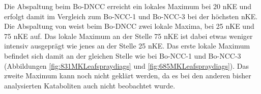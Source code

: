  Die  Abspaltung beim Bo-DNCC erreicht ein lokales Maximum bei 20 \gls{nKE} und erfolgt damit im Vergleich zum Bo-NCC-1 und Bo-NCC-3 bei der höchsten \gls{nKE}. Die Abspaltung von  weist beim Bo-DNCC zwei lokale Maxima, bei 25 \gls{nKE} und 75 \gls{nKE} auf. Das lokale Maximum an der Stelle 75 \gls{nKE} ist dabei etwas weniger intensiv ausgeprägt wie jenes an der Stelle 25 \gls{nKE}. Das erste lokale Maximum befindet sich damit an der gleichen Stelle wie bei Bo-NCC-1 und Bo-NCC-3 (Abbildungen \ref{fig:831MKLeafspraydiags} und \ref{fig:685MKLeafspraydiags}). Das zweite Maximum kann noch nicht geklärt werden, da es bei den anderen bisher analysierten Kataboliten auch nicht beobachtet wurde.

